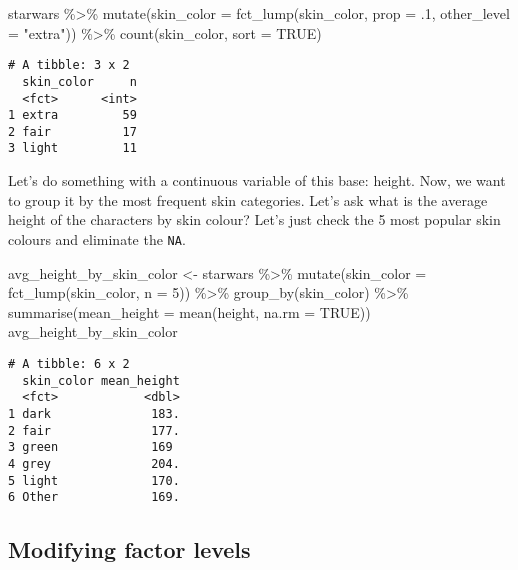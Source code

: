 \documentclass[
]{article}
\newenvironment{Shaded}{\begin{snugshade}}{\end{snugshade}}
\newcommand{\AttributeTok}[1]{\textcolor[rgb]{0.77,0.63,0.00}{#1}}
\newcommand{\ConstantTok}[1]{\textcolor[rgb]{0.00,0.00,0.00}{#1}}
\newcommand{\DecValTok}[1]{\textcolor[rgb]{0.00,0.00,0.81}{#1}}
\newcommand{\FunctionTok}[1]{\textcolor[rgb]{0.00,0.00,0.00}{#1}}
\newcommand{\NormalTok}[1]{#1}
\newcommand{\OtherTok}[1]{\textcolor[rgb]{0.56,0.35,0.01}{#1}}
\newcommand{\SpecialCharTok}[1]{\textcolor[rgb]{0.00,0.00,0.00}{#1}}
\newcommand{\StringTok}[1]{\textcolor[rgb]{0.31,0.60,0.02}{#1}}
\begin{document}
\begin{Shaded}
\begin{Highlighting}[]
\NormalTok{starwars }\SpecialCharTok{\%\textgreater{}\%}
  \FunctionTok{mutate}\NormalTok{(}\AttributeTok{skin\_color =} \FunctionTok{fct\_lump}\NormalTok{(skin\_color, }\AttributeTok{prop =}\NormalTok{ .}\DecValTok{1}\NormalTok{, }\AttributeTok{other\_level =} \StringTok{"extra"}\NormalTok{)) }\SpecialCharTok{\%\textgreater{}\%}
  \FunctionTok{count}\NormalTok{(skin\_color, }\AttributeTok{sort =} \ConstantTok{TRUE}\NormalTok{)}
\end{Highlighting}
\end{Shaded}

\begin{verbatim}
# A tibble: 3 x 2
  skin_color     n
  <fct>      <int>
1 extra         59
2 fair          17
3 light         11
\end{verbatim}

Let's do something with a continuous variable of this base: height. Now,
we want to group it by the most frequent skin categories. Let's ask what
is the average height of the characters by skin colour? Let's just check
the 5 most popular skin colours and eliminate the \texttt{NA}.

\begin{Shaded}
\begin{Highlighting}[]
\NormalTok{avg\_height\_by\_skin\_color }\OtherTok{\textless{}{-}}\NormalTok{ starwars }\SpecialCharTok{\%\textgreater{}\%}
  \FunctionTok{mutate}\NormalTok{(}\AttributeTok{skin\_color =} \FunctionTok{fct\_lump}\NormalTok{(skin\_color, }\AttributeTok{n =} \DecValTok{5}\NormalTok{)) }\SpecialCharTok{\%\textgreater{}\%}
  \FunctionTok{group\_by}\NormalTok{(skin\_color) }\SpecialCharTok{\%\textgreater{}\%}
  \FunctionTok{summarise}\NormalTok{(}\AttributeTok{mean\_height =} \FunctionTok{mean}\NormalTok{(height, }\AttributeTok{na.rm =} \ConstantTok{TRUE}\NormalTok{))}
\NormalTok{avg\_height\_by\_skin\_color}
\end{Highlighting}
\end{Shaded}

\begin{verbatim}
# A tibble: 6 x 2
  skin_color mean_height
  <fct>            <dbl>
1 dark              183.
2 fair              177.
3 green             169 
4 grey              204.
5 light             170.
6 Other             169.
\end{verbatim}

\hypertarget{modifying-factor-levels}{%
\subsection{Modifying factor levels}\label{modifying-factor-levels}}
\end{document}
